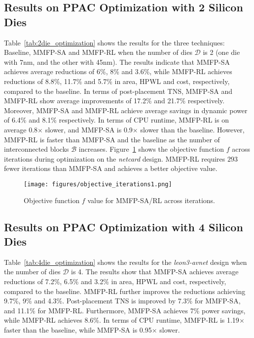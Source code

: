 \subsection{Results on PPAC Optimization with 2 Silicon Dies}
Table~\ref{tab:2die_optimization} shows the results for the three techniques: Baseline, MMFP-SA and MMFP-RL when the number of dies $\mathcal{D}$ is 2 (one die with 7nm, and the other with 45nm). The results indicate that MMFP-SA achieves average reductions of 6\%, 8\% and 3.6\%, while MMFP-RL achieves reductions of 8.8\%, 11.7\% and 5.7\% in area, HPWL and cost, respectively, compared to the baseline. In terms of post-placement TNS, MMFP-SA and MMFP-RL show average improvements of 17.2\% and 21.7\% respectively. Moreover, MMFP-SA and MMFP-RL achieve average savings in dynamic power of 6.4\% and 8.1\% respectively. In terms of CPU runtime, MMFP-RL is on average 0.8$\times$ slower, and MMFP-SA is 0.9$\times$ slower than the baseline. However, MMFP-RL is faster than MMFP-SA and the baseline as the number of interconnected blocks $\mathcal{B}$ increases. Figure~\ref{fig:objective_iteration} shows the objective function $f$ across iterations during optimization on the \emph{netcard} design. MMFP-RL requires $293$ fewer iterations than MMFP-SA and achieves a better objective value.

\begin{figure}[ht] 
\centering
\texttt{[image: figures/objective\_iterations1.png]}
\caption{Objective function $f$ value for MMFP-SA/RL across iterations.}
\label{fig:objective_iteration}
\end{figure}



\subsection{Results on PPAC Optimization with 4 Silicon Dies}
Table~\ref{tab:4die_optimization} shows the results for the \mbox{\emph{leon3-avnet}} design when the number of dies $\mathcal{D}$ is 4. The results show that MMFP-SA achieves average reductions of 7.2\%, 6.5\% and 3.2\% in area, HPWL and cost, respectively, compared to the baseline. MMFP-RL further improves the reductions achieving 9.7\%, 9\% and 4.3\%. Post-placement TNS is improved by 7.3\% for MMFP-SA, and 11.1\% for MMFP-RL. Furthermore, MMFP-SA achieves 7\% power savings, while MMFP-RL achieves 8.6\%. In terms of CPU runtime, MMFP-RL is 1.19$\times$ faster than the baseline, while MMFP-SA is 0.95$\times$ slower.

